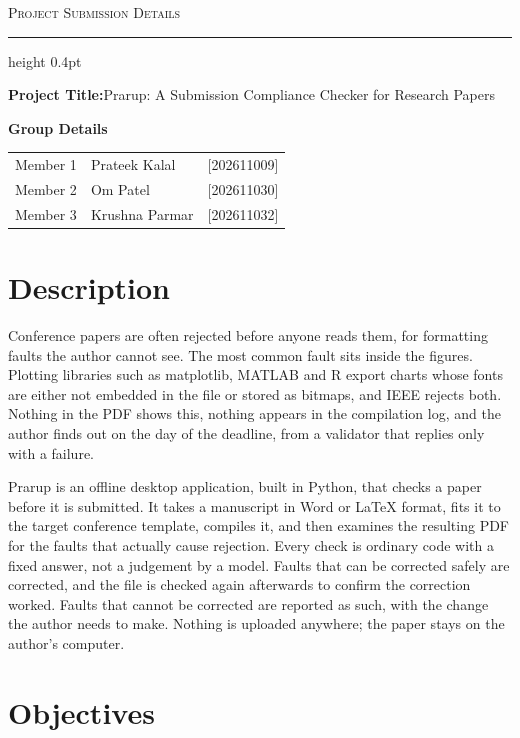 \documentclass[11pt,a4paper]{article}
\newcommand{\heading}[1]{\textbf{#1}}
\begin{document}
\begin{center}
  {\large\scshape Project Submission Details}
\end{center}
\vspace{-2pt}
\hrule height 0.4pt
\vspace{10pt}

\heading{Project Title:}\quad Prarup: A Submission Compliance Checker for
Research Papers

\vspace{6pt}

\heading{Group Details}

\vspace{2pt}
{\setlength{\extrarowheight}{2pt}
\begin{tabular}{@{}l l l@{}}
Member 1 & Prateek Kalal   & [202611009] \\
Member 2 & Om Patel        & [202611030] \\
Member 3 & Krushna Parmar  & [202611032] \\
\end{tabular}}

\section{Description}

Conference papers are often rejected before anyone reads them, for formatting
faults the author cannot see. The most common fault sits inside the figures.
Plotting libraries such as matplotlib, MATLAB and R export charts whose fonts
are either not embedded in the file or stored as bitmaps, and IEEE rejects
both. Nothing in the PDF shows this, nothing appears in the compilation log,
and the author finds out on the day of the deadline, from a validator that
replies only with a failure.

Prarup is an offline desktop application, built in Python, that checks a paper
before it is submitted. It takes a manuscript in Word or \LaTeX{} format, fits
it to the target conference template, compiles it, and then examines the
resulting PDF for the faults that actually cause rejection. Every check is
ordinary code with a fixed answer, not a judgement by a model. Faults that can
be corrected safely are corrected, and the file is checked again afterwards to
confirm the correction worked. Faults that cannot be corrected are reported as
such, with the change the author needs to make. Nothing is uploaded anywhere;
the paper stays on the author's computer.

\section{Objectives}
\end{document}
